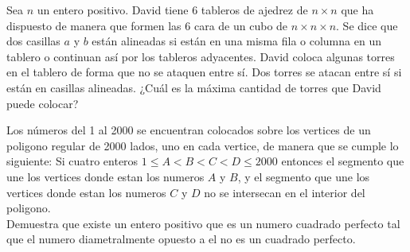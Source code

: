 \documentclass[11pt]{scrartcl}
\begin{document}
\begin{problem}
    [2022/2] 
    Sea $n$ un entero positivo. David tiene $6$ tableros de ajedrez de $n\times n$ que ha dispuesto de manera que formen las $6$ cara de un cubo de $n\times n\times n$. Se dice que dos casillas $a$ y $b$ están alineadas si están en una misma fila o columna en un tablero o continuan así por los tableros adyacentes. David coloca algunas torres en el tablero de forma que no se ataquen entre sí. Dos torres se atacan entre sí si están en casillas alineadas. ¿Cuál es la máxima cantidad de torres que David puede colocar?
\end{problem}
\begin{problem} [2023/2]
    Los números del 1 al 2000 se encuentran colocados sobre los vertices de un poligono regular de 2000 lados, uno en cada vertice, de manera que se cumple lo siguiente: 
    Si cuatro enteros $1 \leq A < B < C < D \leq 2000$ entonces el segmento que une los vertices donde estan los numeros $A$ y $B$, y el segmento que une los vertices donde estan los numeros $C$ y $D$ no se intersecan en el interior del poligono.  \\
    Demuestra que existe un entero positivo que es un numero cuadrado perfecto tal que el numero diametralmente opuesto a el no es un cuadrado perfecto.
\end{problem}
\end{document}
